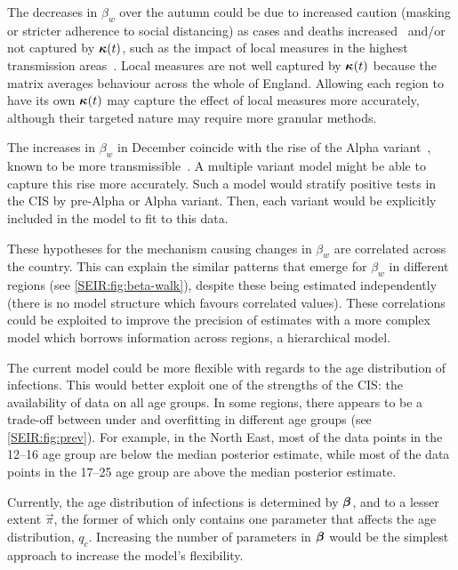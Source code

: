 \documentclass[thesis.tex]{subfiles}
\begin{document}
The decreases in $\beta_w$ over the autumn could be due to increased caution (\eg masking or stricter adherence to social distancing) as cases and deaths increased~\autocite{jarvisEffect} and/or not captured by $\bm{\kappa}(t)$, such as the impact of local measures in the highest transmission areas~\autocite{scottCovid19}.
Local measures are not well captured by $\bm{\kappa}(t)$ because the matrix averages behaviour across the whole of England.
Allowing each region to have its own $\bm{\kappa}(t)$ may capture the effect of local measures more accurately, although their targeted nature may require more granular methods.

The increases in $\beta_w$ in December coincide with the rise of the Alpha variant~\autocite{lythgoeLineage}, known to be more transmissible~\autocite[e.g.][]{daviesEstimated}.
A multiple variant model might be able to capture this rise more accurately.
Such a model would stratify positive tests in the CIS by pre-Alpha or Alpha variant.
Then, each variant would be explicitly included in the model to fit to this data.

These hypotheses for the mechanism causing changes in $\beta_w$ are correlated across the country.
This can explain the similar patterns that emerge for $\beta_w$ in different regions (see \cref{SEIR:fig:beta-walk}), despite these being estimated independently (\ie there is no model structure which favours correlated values).
These correlations could be exploited to improve the precision of estimates with a more complex model which borrows information across regions, \eg a hierarchical model.

The current model could be more flexible with regards to the age distribution of infections.
This would better exploit one of the strengths of the CIS: the availability of data  on all age groups.
In some regions, there appears to be a trade-off between under and overfitting in different age groups (see \cref{SEIR:fig:prev}).
For example, in the North East, most of the data points in the 12--16 age group are below the median posterior estimate, while most of the data points in the 17--25 age group are above the median posterior estimate.

Currently, the age distribution of infections is determined by $\bm{\beta}$, and to a lesser extent $\vec{\pi}$, the former of which only contains one parameter that affects the age distribution, $q_c$.
Increasing the number of parameters in $\bm{\beta}$ would be the simplest approach to increase the model's flexibility.
\end{document}
